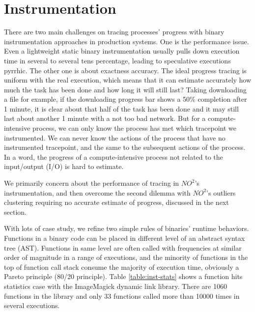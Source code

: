 \section{Instrumentation}

There are two main challenges on tracing processes' progress with binary instrumentation approaches in production systems. One is the performance issue. Even a lightweight static binary instrumentation usually pulls down execution time in several to several tens percentage, leading to speculative executions pyrrhic.  The other one is about exactness accuracy. The ideal progress tracing is uniform with the real execution, which means that it can estimate accurately how much the task has been done and how long it will still last? Taking downloading a file for example, if the downloading progress bar shows a 50\% completion after 1 minute, it is clear about that half of the task has been done and it may still last about another 1 minute with a not too bad network. But for a compute-intensive process, we can only know the process has met which tracepoint we instrumented. We can never know the actions of the process that have no instrumented tracepoint, and the same to the subsequent actions of the process. In a word, the progress of a compute-intensive process not related to the input/output (I/O) is hard to estimate.

We primarily concern about the performance of tracing in $NO^2$'s instrumentation, and then overcome the second dilemma with $NO^2$'s outliers clustering requiring no accurate estimate of progress, discussed in the next section.

With lots of case study, we refine two simple rules of binaries' runtime behaviors. Functions in a binary code can be placed in different level of an abstract syntax tree (AST). Functions in same level are often called with frequencies at similar order of magnitude in a range of executions, and the minority of functions in the top of function call stack consume the majority of execution time, obviously a Pareto principle (80/20 principle). Table \ref{table:inst-stats} shows a function hits statistics case with the ImageMagick dynamic link library. There are 1060 functions in the library and only 33 functions called more than 10000 times in several executions.

